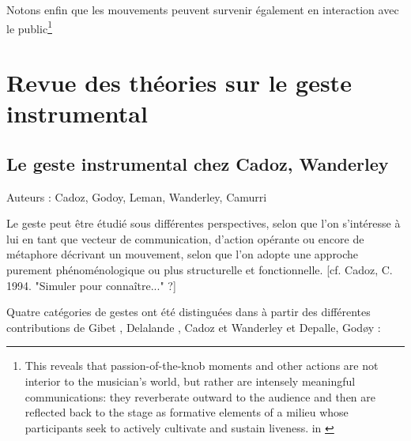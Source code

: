 Notons enfin que les mouvements peuvent survenir également en interaction avec le public\footnote{This reveals that passion-of-the-knob moments and other actions are not interior to the musician’s world, but rather are intensely meaningful communications: they reverberate outward to the audience and then are reflected back to the stage as formative elements of a milieu whose participants seek to actively cultivate and sustain liveness. in \cite{butler_playing_2014}} 



\section{Revue des théories sur le geste instrumental}

\subsection{Le geste instrumental chez Cadoz, Wanderley}

Auteurs : Cadoz, Godoy, Leman, Wanderley, Camurri 

Le geste peut être étudié sous différentes perspectives, selon que l'on s'intéresse à lui en tant que vecteur de communication, d'action opérante ou encore de métaphore décrivant un mouvement, selon que l'on adopte une approche purement phénoménologique ou plus structurelle et fonctionnelle. [cf. Cadoz, C. 1994. "Simuler pour connaître..." ?]

Quatre catégories de gestes ont été distinguées dans \cite{jensenius_musical_2010} à partir des différentes contributions de Gibet \cite{gibet_codage_1987}, Delalande \cite{delalande_geste_1988}, Cadoz \cite{cadoz_gesture_2000} et Wanderley et Depalle\cite{wanderley_gestural_2004}, Godøy \cite{godoy_exploring_2006}:

